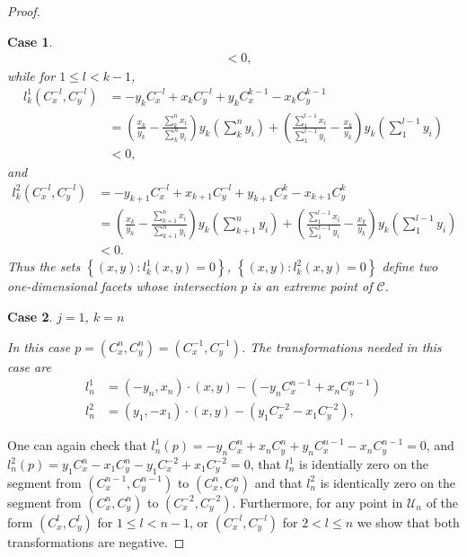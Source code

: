 \documentclass{article}
\theoremstyle{case}
\newtheorem{case}{Case}
\begin{document}
\begin{proof}
\begin{case}
\begin{align*}
&< 0,
\end{align*}
while for $1 \leq l < k-1$,
\begin{align*}
l_k^1\left( C_x^{-l}, C_y^{-l}\right) &= -y_kC_x^{-l} + x_kC_{y}^{-l} + y_kC_x^{k-1} - x_kC_y^{k-1} \\
&=\left( \frac{x_k}{y_k} - \frac{\sum_k^nx_i}{\sum_k^ny_i}\right)y_k\left(\sum_k^n y_i\right)  + \left( \frac{\sum_1^{l-1}x_i}{\sum_1^{l-1}y_i} - \frac{x_k}{y_k}\right)y_k\left(\sum_1^{l-1}y_i\right) \\
&< 0,
\end{align*}
and
\begin{align*}
l_k^2\left( C_x^{-l}, C_y^{-l}\right) &= -y_{k+1}C_x^{-l} + x_{k+1}C_y^{-l} + y_{k+1}C_x^k - x_{k+1}C_y^k \\
&= \left( \frac{x_k}{y_k} - \frac{\sum_{k+1}^nx_i}{\sum_{k+1}^ny_i}\right)y_k\left( \sum_{k+1}^n y_i\right) + \left( \frac{\sum_1^{l-1}x_i}{\sum_1^{l-1}y_i} - \frac{x_k}{y_k}\right)y_k\left( \sum_1^{l-1}y_i\right) \\
&< 0.
\end{align*}
Thus the sets $\left\lbrace \left( x,y\right) \colon l_k^1\left( x,y\right) = 0\right\rbrace$, $\left\lbrace \left( x,y\right) \colon l_k^2\left( x,y\right) = 0\right\rbrace$ define two one-dimensional facets whose intersection $p$ is an extreme point of $\mathcal{C}$.
\end{case}

\begin{case} $j = 1$, $k = n$

In this case $p = \left(C_x^n, C_y^n\right) = \left( C_x^{-1}, C_y^{-1}\right)$. The transformations needed in this case are
\begin{align*}
l_n^1 &= \left( -y_n, x_n\right) \cdot \left( x,y\right) - \left( -y_nC_x^{n-1} + x_nC_y^{n-1}\right) \\
l_n^2 &= \left( y_1, -x_1\right) \cdot \left( x,y\right) - \left( y_1C_x^{-2} - x_1C_y^{-2}\right),
\end{align*}
\end{case}
One can again check that $l_n^1\left( p\right) = -y_nC_x^n + x_nC_y^n + y_nC_x^{n-1} - x_nC_y^{n-1} = 0$, and $l_n^2\left( p\right) = y_1C_x^n - x_1C_y^n - y_1C_x^{-2} + x_1C_y^{-2} = 0$, that $l_n^1$ is identially zero on the segment from $\left( C_x^{n-1}, C_y^{n-1}\right)$ to $\left( C_x^n, C_y^n\right)$ and that $l_n^2$ is identically zero on the segment from $\left( C_x^n, C_y^n\right)$ to $\left( C_x^{-2}, C_y^{-2}\right)$. Furthermore, for any point in $\mathcal{U}_n$ of the form $\left( C_x^l, C_y^l\right)$ for $1 \leq l < n-1$, or $\left( C_x^{-l}, C_y^{-l}\right)$ for $2 < l \leq n$ we show that both transformations are negative.


\end{proof}
\end{document}
